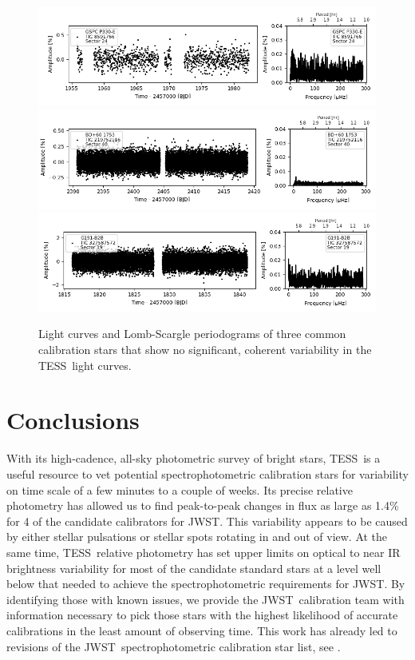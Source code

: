 \documentclass[twocolumn]{aastex631}
\newcommand{\webb}{JWST}
\newcommand{\jwst}{JWST}
\newcommand{\tess}{TESS}
\begin{document}
\begin{figure}
    \centering
    \includegraphics[width=0.8\linewidth]{figures/tic00000008591766_s024_flat2.fits.png}
    \includegraphics[width=0.8\linewidth]{tic00000219752116_s040_flat1.fits.png}
    \includegraphics[width=0.8\linewidth]{figures/tic00000327587572_s019_norm1.fits.png}
    \caption{Light curves and Lomb-Scargle periodograms of three common calibration stars that show no significant, coherent variability in the \tess\ light curves.}
    \label{fig:novar}
\end{figure}




\section{Conclusions}
\label{sec:conclusion}

With its high-cadence, all-sky photometric survey of bright stars, \tess\ is a useful resource to vet potential spectrophotometric calibration stars for variability on time scale of a few minutes to a couple of weeks. Its precise relative photometry has allowed us to find peak-to-peak changes in flux as large as 1.4\% for 4 of the candidate calibrators for \webb. This variability appears to be caused by either stellar pulsations or stellar spots rotating in and out of view. At the same time, \tess\ relative photometry has set upper limits on optical to near IR brightness variability for most of the candidate standard stars at a level well below that needed to achieve the spectrophotometric requirements for \jwst. By identifying those with known issues, we provide the \webb\ calibration team with information necessary to pick those stars with the highest likelihood of accurate calibrations in the least amount of observing time. This work has already led to revisions of the \webb\ spectrophotometric calibration star list, see \citet{Gordon2022inprep}.
\end{document}
